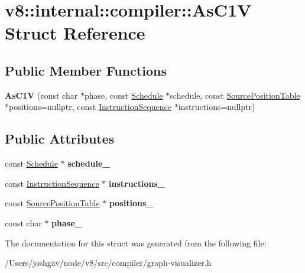 \hypertarget{structv8_1_1internal_1_1compiler_1_1_as_c1_v}{}\section{v8\+:\+:internal\+:\+:compiler\+:\+:As\+C1V Struct Reference}
\label{structv8_1_1internal_1_1compiler_1_1_as_c1_v}
\subsection*{Public Member Functions}
\begin{DoxyCompactItemize}
\item 
{\bfseries As\+C1V} (const char $\ast$phase, const \hyperlink{classv8_1_1internal_1_1compiler_1_1_schedule}{Schedule} $\ast$schedule, const \hyperlink{classv8_1_1internal_1_1compiler_1_1_source_position_table}{Source\+Position\+Table} $\ast$positions=nullptr, const \hyperlink{classv8_1_1internal_1_1compiler_1_1_instruction_sequence}{Instruction\+Sequence} $\ast$instructions=nullptr)\hypertarget{structv8_1_1internal_1_1compiler_1_1_as_c1_v_ab07075a3ab7e2376d3a1386d9012911c}{}\label{structv8_1_1internal_1_1compiler_1_1_as_c1_v_ab07075a3ab7e2376d3a1386d9012911c}

\end{DoxyCompactItemize}
\subsection*{Public Attributes}
\begin{DoxyCompactItemize}
\item 
const \hyperlink{classv8_1_1internal_1_1compiler_1_1_schedule}{Schedule} $\ast$ {\bfseries schedule\+\_\+}\hypertarget{structv8_1_1internal_1_1compiler_1_1_as_c1_v_a70da8ae295a48ad94170a23b98c714b4}{}\label{structv8_1_1internal_1_1compiler_1_1_as_c1_v_a70da8ae295a48ad94170a23b98c714b4}

\item 
const \hyperlink{classv8_1_1internal_1_1compiler_1_1_instruction_sequence}{Instruction\+Sequence} $\ast$ {\bfseries instructions\+\_\+}\hypertarget{structv8_1_1internal_1_1compiler_1_1_as_c1_v_ac03fd49601725862023437474e702b60}{}\label{structv8_1_1internal_1_1compiler_1_1_as_c1_v_ac03fd49601725862023437474e702b60}

\item 
const \hyperlink{classv8_1_1internal_1_1compiler_1_1_source_position_table}{Source\+Position\+Table} $\ast$ {\bfseries positions\+\_\+}\hypertarget{structv8_1_1internal_1_1compiler_1_1_as_c1_v_a33f639b804e5589874dedc81f1824f5f}{}\label{structv8_1_1internal_1_1compiler_1_1_as_c1_v_a33f639b804e5589874dedc81f1824f5f}

\item 
const char $\ast$ {\bfseries phase\+\_\+}\hypertarget{structv8_1_1internal_1_1compiler_1_1_as_c1_v_ae93a6721597cb97ae1c6efb5cde259a9}{}\label{structv8_1_1internal_1_1compiler_1_1_as_c1_v_ae93a6721597cb97ae1c6efb5cde259a9}

\end{DoxyCompactItemize}


The documentation for this struct was generated from the following file\+:\begin{DoxyCompactItemize}
\item 
/\+Users/joshgav/node/v8/src/compiler/graph-\/visualizer.\+h\end{DoxyCompactItemize}
